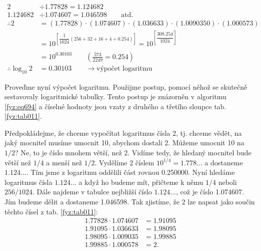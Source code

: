     \begin{strip}
      \begin{align}\label{fyz:eq694}
                     2&÷\num{1.77828} =\num{1.124682}                                    \nonumber\\
        \num{1.124682}&÷\num{1.074607}=\num{1.046598}                 \qquad\text{atd.}  \nonumber\\
                  ∴  2&=(\num{1.77828})\cdot(\num{1.074607})\cdot
                       (\num{1.036633})\cdot(\num{1.0090350})\cdot(\num{1.000573})       \nonumber\\
                      &=10^{\left[\dfrac{1}{1024}(256+32+16+4+\num{0.254})\right]}
                       =10^{\left[\dfrac{308.254}{1024}\right]}                          \nonumber\\                                  \nonumber\\
                      &=10^{\num{0.30103}}\qquad\left(\frac{573}{2249}=\num{0.254}\right)\nonumber\\
          ∴ \log_{10}2&=\num{0.30103}    \qquad\rightarrow\text{výpočet logaritmu}                                       
      \end{align}
    \end{strip}

    Proveďme nyní výpočet logaritmu. Použijme postup, pomocí něhož se skutečně sestavovaly
    logaritmické tabulky. Tento postup je znázorněn v algoritmu \ref{fyz:eq694} a číselné hodnoty
    jsou vzaty z druhého a třetího sloupce tab. \ref{fyz:tab011}.

    Předpokládejme, že chceme vypočítat logaritmus čísla \num{2}, tj. chceme vědět, na jaký mocnitel
    musíme umocnit \num{10}, abychom dostali \num{2}. Můžeme umocnit \num{10} na \(1/2\)? Ne, to je
    číslo mnohem větší, než \num{2}. Vidíme tedy, že hledaný mocnitel bude větší než \(1/4\) a menší
    než \(1/2\). Vydělíme \num{2} číslem \(10^{1/4} = \num{1.778}\ldots\) a dostaneme
    \(\num{1.124}\ldots\). Tím jsme z logaritmu oddělili část rovnou \num{0.250000}. Nyní hledáme
    logaritmus čísla \(\num{1.124}\ldots\) a když ho budeme mít, přičteme k němu \(1/4\) neboli
    \(256/1024\). Dále najdeme v tabulce nejbližší číslo \(\num{1.124}\ldots\), což je číslo
    \num{1.074607}. Jím budeme dělit a dostaneme \num{1.046598}. Tak zjistíme, že \num{2} lze napsat
    jako součin těchto čísel z tab. \ref{fyz:tab011}:
    \begin{align*}
      \num{1.77828}\cdot\num{1.074607} &= \num{1.91095}                                        \\
      \num{1.91095}\cdot\num{1.036633} &= \num{1.98095}                                        \\
      \num{1.98095}\cdot\num{1.009035} &= \num{1.99885}                                        \\
      \num{1.99885}\cdot\num{1.000578} &= \num{2}.
    \end{align*}

